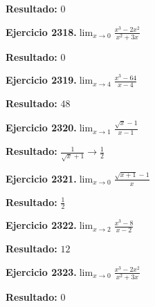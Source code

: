 \documentclass[10pt,a4paper]{article}
\begin{document}
\begin{solbox}
\textbf{Resultado:} \(\displaystyle 0\)
\end{solbox}

\newpage
\begin{ejbox}
\textbf{Ejercicio 2318.}\quad $\lim_{x\to 0} \frac{x^3-2x^2}{x^2+3x}$
\end{ejbox}

\begin{solbox}
\textbf{Resultado:} \(\displaystyle 0\)
\end{solbox}

\begin{ejbox}
\textbf{Ejercicio 2319.}\quad $\lim_{x\to 4} \frac{x^3-64}{x-4}$
\end{ejbox}

\begin{solbox}
\textbf{Resultado:} \(\displaystyle 48\)
\end{solbox}

\begin{ejbox}
\textbf{Ejercicio 2320.}\quad $\lim_{x\to 1} \frac{\sqrt{x}-1}{x-1}$
\end{ejbox}

\begin{solbox}
\textbf{Resultado:} \(\displaystyle \frac{1}{\sqrt{x}+1} \to \frac{1}{2}\)
\end{solbox}

\newpage
\begin{ejbox}
\textbf{Ejercicio 2321.}\quad $\lim_{x\to 0} \frac{\sqrt{x+1}-1}{x}$
\end{ejbox}

\begin{solbox}
\textbf{Resultado:} \(\displaystyle \frac{1}{2}\)
\end{solbox}

\begin{ejbox}
\textbf{Ejercicio 2322.}\quad $\lim_{x\to 2} \frac{x^3-8}{x-2}$
\end{ejbox}

\begin{solbox}
\textbf{Resultado:} \(\displaystyle 12\)
\end{solbox}

\begin{ejbox}
\textbf{Ejercicio 2323.}\quad $\lim_{x\to 0} \frac{x^3-2x^2}{x^2+3x}$
\end{ejbox}

\begin{solbox}
\textbf{Resultado:} \(\displaystyle 0\)
\end{solbox}
\end{document}
